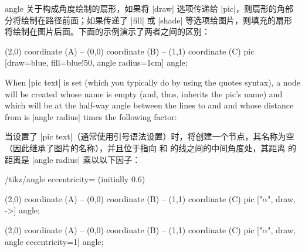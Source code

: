 \begin{pictype}{angle}{}
    关于构成角度绘制的扇形，如果将 |draw| 选项传递给 |pic|，则扇形的角部分将绘制在路径前面；如果传递了 |fill| 或 |shade| 等选项给图片，则填充的扇形将绘制在图片后面。下面的示例演示了两者之间的区别：


\begin{codeexample}[preamble={\usetikzlibrary{angles}}]
\tikz \draw [line width=2mm]
      (2,0) coordinate (A) -- (0,0) coordinate (B)
   -- (1,1) coordinate (C)
     pic [draw=blue, fill=blue!50, angle radius=1cm] {angle};
\end{codeexample}

    When |pic text| is set (which you typically do by using the quotes syntax),
    a node will be created whose name is empty (and, thus, inherits the pic's
    name) and which will be at the half-way angle between the lines to 
    and  and whose distance from  is |angle radius| times the
    following factor:
    
    当设置了 |pic text|（通常使用引号语法设置）时，将创建一个节点，其名称为空（因此继承了图片的名称），并且位于指向  和  的线之间的中间角度处，其距离  的距离是 |angle radius| 乘以以下因子：


    \begin{key}{/tikz/angle eccentricity= (initially 0.6)}
\begin{codeexample}[preamble={\usetikzlibrary{angles,quotes}}]
\tikz \draw (2,0) coordinate (A) -- (0,0) coordinate (B)
         -- (1,1) coordinate (C)
  pic ["$\alpha$", draw, ->] {angle};
\end{codeexample}
\begin{codeexample}[preamble={\usetikzlibrary{angles,quotes}}]
\tikz \draw (2,0) coordinate (A) -- (0,0) coordinate (B)
         -- (1,1) coordinate (C)
  pic ["$\alpha$", draw, angle eccentricity=1] {angle};
\end{codeexample}
\begin{codeexample}[preamble={\usetikzlibrary{angles,quotes}}]
\end{codeexample}
    \end{key}
\end{pictype}

